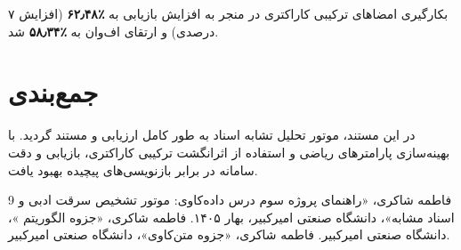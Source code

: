 \documentclass[12pt,onecolumn,a4paper]{article}
\begin{document}
بکارگیری امضاهای ترکیبی کاراکتری در  منجر به افزایش بازیابی به \textbf{٪۶۲٫۴۸} (افزایش ۷ درصدی) و ارتقای اف‌وان به \textbf{٪۵۸٫۳۴} شد.

\section{جمع‌بندی}
در این مستند، موتور تحلیل تشابه اسناد به طور کامل ارزیابی و مستند گردید. با بهینه‌سازی پارامترهای ریاضی و استفاده از اثرانگشت ترکیبی کاراکتری، بازیابی و دقت سامانه در برابر بازنویسی‌های پیچیده بهبود یافت.

\begin{thebibliography}{9}
 فاطمه شاکری، «راهنمای پروژه سوم درس داده‌کاوی: موتور تشخیص سرقت ادبی و اسناد مشابه»، دانشگاه صنعتی امیرکبیر، بهار ۱۴۰۵.
 فاطمه شاکری، «جزوه الگوریتم »، دانشگاه صنعتی امیرکبیر.
 فاطمه شاکری، «جزوه متن‌کاوی»، دانشگاه صنعتی امیرکبیر.
\end{thebibliography}
\end{document}
